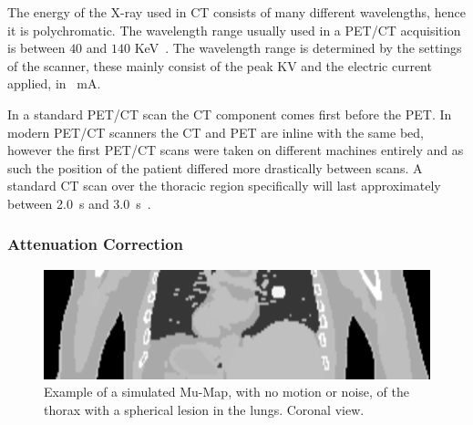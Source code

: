             The energy of the X-ray used in \gls{CT} consists of many different wavelengths, hence it is polychromatic. The wavelength range usually used in a \gls{PET}/\gls{CT} acquisition is between $40$ and $140$ \gls{KeV}~\parencite{CTattenuationenergyBib}. The wavelength range is determined by the settings of the scanner, these mainly consist of the peak \gls{KV} and the electric current applied, in \SI{}{\milli\ampere}.
            
            In a standard \gls{PET}/\gls{CT} scan the \gls{CT} component comes first before the \gls{PET}. In modern \gls{PET}/\gls{CT} scanners the \gls{CT} and \gls{PET} are inline with the same bed, however the first \gls{PET}/\gls{CT} scans were taken on different machines entirely and as such the position of the patient differed more drastically between scans. A standard \gls{CT} scan over the thoracic region specifically will last approximately between \SI{2.0}{\second} and \SI{3.0}{\second}~\parencite{PETCTImagingTechnicalConsiderationsBib}.
        
            \subsubsection{Attenuation Correction} \label{sec:attenuation_correction}
                \begin{figure}
                    \centering
                    
                    \includegraphics[width=1.0\linewidth]{figures/background_mu_map_example.png}
                    
                    \captionsetup{singlelinecheck=false, justification=raggedright}
                    \caption{Example of a simulated \gls{Mu-Map}, with no motion or noise, of the thorax with a spherical lesion in the lungs. Coronal view.} \label{fig:combined_pet_ct_mu_map_example}
                \end{figure}
                
